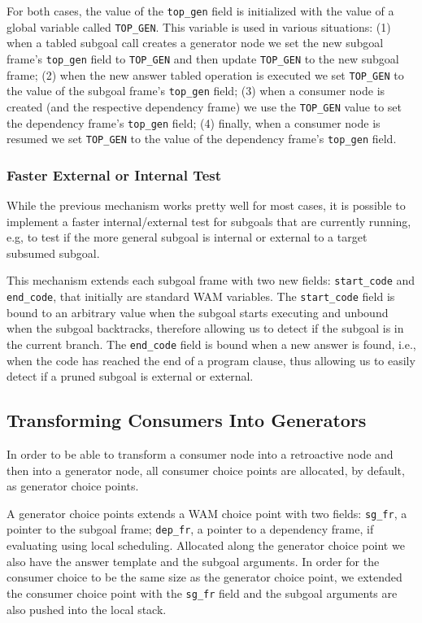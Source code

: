 For both cases, the value of the \texttt{top\_gen} field is initialized with the value
of a global variable called \texttt{TOP\_GEN}. This variable is used in various
situations: (1) when a tabled subgoal call creates a generator node we set the
new subgoal frame's \texttt{top\_gen} field to \texttt{TOP\_GEN} and then update
\texttt{TOP\_GEN} to the new subgoal frame; (2) when the new answer tabled operation
is executed we set \texttt{TOP\_GEN} to the value of the subgoal frame's \texttt{top\_gen}
field; (3) when a consumer node is created (and the respective dependency frame) we
use the \texttt{TOP\_GEN} value to set the dependency frame's \texttt{top\_gen} field;
(4) finally, when a consumer node is resumed we set \texttt{TOP\_GEN} to the value
of the dependency frame's \texttt{top\_gen} field.

\subsubsection{Faster External or Internal Test}

While the previous mechanism works pretty well for most cases, it is possible to
implement a faster internal/external test for subgoals that are currently running,
e.g, to test if the more general subgoal is internal or external to a target subsumed
subgoal.

This mechanism extends each subgoal frame with two new fields: \texttt{start\_code}
and \texttt{end\_code}, that initially are standard WAM variables.
The \texttt{start\_code} field is bound to an arbitrary value when the subgoal starts
executing and unbound when the subgoal backtracks, therefore allowing us to detect
if the subgoal is in the current branch. The \texttt{end\_code} field is bound
when a new answer is found, i.e., when the code has reached the end of a program
clause, thus allowing us to easily detect if a pruned subgoal is external or external.

\subsection{Transforming Consumers Into Generators}

In order to be able to transform a consumer node into a retroactive node and then into a generator node,
all consumer choice points are allocated, by default, as generator choice points.

A generator choice points extends a WAM choice point with two fields:
\texttt{sg\_fr}, a pointer to the subgoal frame; \texttt{dep\_fr}, a pointer to a dependency frame,
if evaluating using local scheduling. Allocated along the generator choice point we also have the answer
template and the subgoal arguments. In order for the consumer choice to be the same size as the
generator choice point, we extended the consumer choice point with the \texttt{sg\_fr} field and
the subgoal arguments are also pushed into the local stack.

